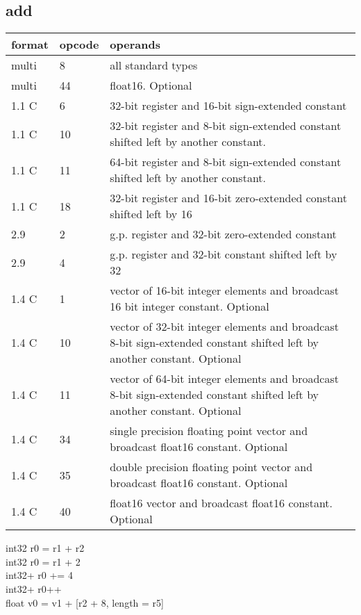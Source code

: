 \documentclass[forwardcom.tex]{subfiles}
\begin{document}
\subsection{add}
\label{table:addInstruction}
\begin{tabular}{|p{12mm}|p{15mm}|p{100mm}|}
\hline
\bfseries format & \bfseries opcode & \bfseries operands \\ \hline
multi &  8 & all standard types \\ \hline
multi & 44 & float16. Optional \\ \hline
1.1 C &  6 & 32-bit register and 16-bit sign-extended constant \\ \hline
1.1 C & 10 & 32-bit register and 8-bit sign-extended constant shifted left by another constant. \\ \hline
1.1 C & 11 & 64-bit register and 8-bit sign-extended constant shifted left by another constant. \\ \hline
1.1 C & 18 & 32-bit register and 16-bit zero-extended constant shifted left by 16 \\ \hline
2.9   &  2 & g.p. register and 32-bit zero-extended constant \\ \hline
2.9   &  4 & g.p. register and 32-bit constant shifted left by 32 \\ \hline
1.4 C &  1 & vector of 16-bit integer elements and broadcast 16 bit integer constant. Optional \\ \hline
1.4 C & 10 & vector of 32-bit integer elements and broadcast 8-bit sign-extended constant shifted left by another constant. Optional \\ \hline
1.4 C & 11 & vector of 64-bit integer elements and broadcast 8-bit sign-extended constant shifted left by another constant. Optional \\ \hline
1.4 C & 34 & single precision floating point vector and broadcast float16 constant. Optional \\ \hline
1.4 C & 35 & double precision floating point vector and broadcast float16 constant. Optional \\ \hline
1.4 C & 40 & float16 vector and broadcast float16 constant. Optional \\ \hline
\end{tabular}
\vv

int32 r0 = r1 + r2 \\
int32 r0 = r1 + 2 \\
int32+ r0 += 4 \\
int32+ r0++ \\
float v0 = v1 + [r2 + 8, length = r5]
\vv
\end{document}
